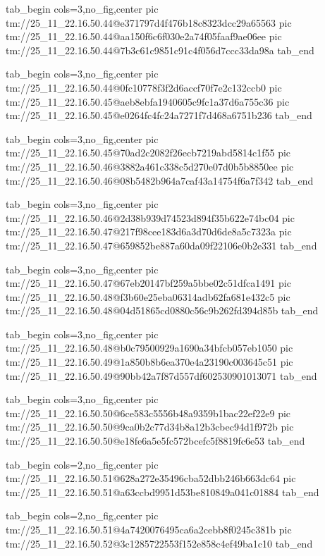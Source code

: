 \ifcmt
  tab_begin cols=3,no_fig,center
    pic tm://25_11_22.16.50.44@e371797d4f476b18c8323dcc29a65563
    pic tm://25_11_22.16.50.44@aa150f6c6f030e2a74f05faaf9ae06ee
    pic tm://25_11_22.16.50.44@7b3c61c9851c91c4f056d7ccc33da98a
  tab_end
\fi


\ifcmt
  tab_begin cols=3,no_fig,center
    pic tm://25_11_22.16.50.44@0fc10778f3f2d6accf70f7e2c132ccb0
    pic tm://25_11_22.16.50.45@aeb8ebfa1940605c9fc1a37d6a755c36
    pic tm://25_11_22.16.50.45@e0264fc4fc24a7271f7d468a6751b236
  tab_end
\fi


\ifcmt
  tab_begin cols=3,no_fig,center
    pic tm://25_11_22.16.50.45@70ad2c2082f26ecb7219abd5814c1f55
    pic tm://25_11_22.16.50.46@3882a461c338c5d270e07d0b5b8850ee
    pic tm://25_11_22.16.50.46@08b5482b964a7caf43a14754f6a7f342
  tab_end
\fi


\ifcmt
  tab_begin cols=3,no_fig,center
    pic tm://25_11_22.16.50.46@2d38b939d74523d894f35b622e74bc04
    pic tm://25_11_22.16.50.47@217f98cee183d6a3d70d6de8a5c7323a
    pic tm://25_11_22.16.50.47@659852be887a60da09f22106e0b2e331
  tab_end
\fi


\ifcmt
  tab_begin cols=3,no_fig,center
    pic tm://25_11_22.16.50.47@67eb20147bf259a5bbe02c51dfca1491
    pic tm://25_11_22.16.50.48@f3b60e25eba06314adb62fa681e432c5
    pic tm://25_11_22.16.50.48@04d51865cd0880c56c9b262fd394d85b
  tab_end
\fi


\ifcmt
  tab_begin cols=3,no_fig,center
    pic tm://25_11_22.16.50.48@b0c79500929a1690a34bfcb057eb1050
    pic tm://25_11_22.16.50.49@1a850b8b6ea370e4a23190c003645c51
    pic tm://25_11_22.16.50.49@90bb42a7f87d557df602530901013071
  tab_end
\fi


\ifcmt
  tab_begin cols=3,no_fig,center
    pic tm://25_11_22.16.50.50@6ce583c5556b48a9359b1bac22ef22e9
    pic tm://25_11_22.16.50.50@9ca0b2c77d34b8a12b3cbec94d1f972b
    pic tm://25_11_22.16.50.50@e18fe6a5e5fc572bcefc5f8819fc6e53
  tab_end
\fi


\ifcmt
  tab_begin cols=2,no_fig,center
    pic tm://25_11_22.16.50.51@628a272e35496cba52dbb246b663dc64
    pic tm://25_11_22.16.50.51@a63ccbd9951d53be810849a041c01884
  tab_end
\fi


\ifcmt
  tab_begin cols=2,no_fig,center
    pic tm://25_11_22.16.50.51@4a7420076495ca6a2cebb8f0245c381b
    pic tm://25_11_22.16.50.52@3c1285722553f152e858c4ef49ba1c10
  tab_end
\fi

